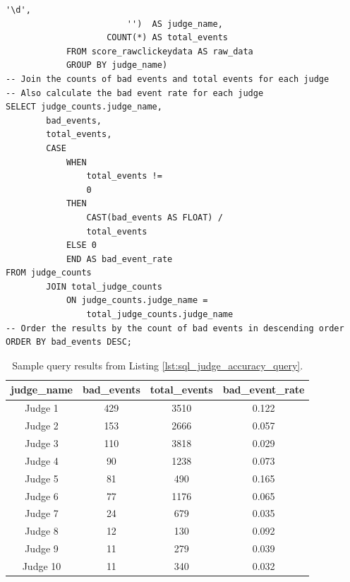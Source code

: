 \documentclass[11pt]{article}
\begin{document}
\begin{lstlisting}[style=sql, caption={Query to calculate timing stats}, label={lst:sql_judge_accuracy_query}, ]
                        '\d',
                        '')  AS judge_name,
                    COUNT(*) AS total_events
            FROM score_rawclickeydata AS raw_data
            GROUP BY judge_name)
-- Join the counts of bad events and total events for each judge
-- Also calculate the bad event rate for each judge
SELECT judge_counts.judge_name,
        bad_events,
        total_events,
        CASE
            WHEN
                total_events !=
                0
            THEN
                CAST(bad_events AS FLOAT) /
                total_events
            ELSE 0
            END AS bad_event_rate
FROM judge_counts
        JOIN total_judge_counts
            ON judge_counts.judge_name =
                total_judge_counts.judge_name
-- Order the results by the count of bad events in descending order
ORDER BY bad_events DESC;
\end{lstlisting}

\begin{table}[H]
    \centering
    \caption{Sample query results from Listing \ref{lst:sql_judge_accuracy_query}.}
    \label{tab:my-table}
    \begin{tabular}{|c|c|c|c|}
        \hline
        \textbf{judge\_name} & \textbf{bad\_events} & \textbf{total\_events} & \textbf{bad\_event\_rate} \\ \hline
        Judge 1              & 429                  & 3510                   & 0.122                     \\
        Judge 2              & 153                  & 2666                   & 0.057                     \\
        Judge 3              & 110                  & 3818                   & 0.029                     \\
        Judge 4              & 90                   & 1238                   & 0.073                     \\
        Judge 5              & 81                   & 490                    & 0.165                     \\
        Judge 6              & 77                   & 1176                   & 0.065                     \\
        Judge 7              & 24                   & 679                    & 0.035                     \\
        Judge 8              & 12                   & 130                    & 0.092                     \\
        Judge 9              & 11                   & 279                    & 0.039                     \\
        Judge 10             & 11                   & 340                    & 0.032                     \\
        \hline
    \end{tabular}
\end{table}
\end{document}
